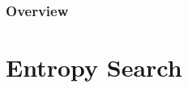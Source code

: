 \documentclass[10pt,handout]{beamer}
\begin{document}
%
%
%



\begin{frame}
\frametitle{Overview} %
\tableofcontents %
\end{frame}



\section{Entropy Search}
\end{document}
